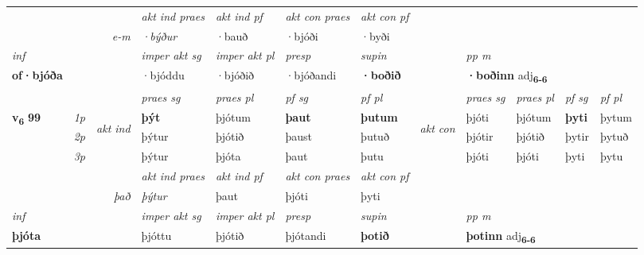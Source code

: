 \begin{longtable}[l]{X>{\footnotesize\itshape}llXXXXlXXXX}
   && &  \textit{akt ind praes} & \textit{akt ind pf} & \textit{akt con praes} & \textit{akt con pf} \\*
\multicolumn{3}{r}{\textit{e-m}} & ·býður & ·bauð & ·bjóði & ·byði \\*

\cmidrule{4-7}
   {\textit{inf}} & &  & \textit{imper akt sg} & \textit{imper akt pl}   & \textit{presp} & \textit{supin}  && \textit{pp m} \\*
  {\textbf{of\allowbreak ·bjóða}} & && ·bjóddu  & ·bjóðið   & ·bjóðandi &  \textbf{·boðið}  && \multicolumn{2}{l}{\textbf{·boðinn} adj\textbf{\textsubscript{6-6}}} \\*

\midrule

 & &   & \textit{praes sg}  & \textit{praes pl}    & \textit{ pf sg} & \textit{pf pl} & & \textit{praes sg}  & \textit{praes pl}    & \textit{pf sg} & \textit{pf pl }  \\ \cmidrule{4-7} \cmidrule{9-12}
 \multirow{2}{*}{{{\textbf{v{\textsubscript{6}}} \Large{\textbf{99}}}}}  & 1p & \multirow{3}{*}{\begin{turn}{90}\textit{akt ind}\end{turn}} & \textbf{þýt} & þjótum & \textbf{þaut} & \textbf{þutum} & \multirow{3}{*}{\begin{turn}{90}\textit{akt con}\end{turn}} &þjóti & þjótum & \textbf{þyti} & þytum\\*
 & 2p &  &  þýtur  & þjótið & þaust & þutuð & & þjótir & þjótið & þytir & þytuð \\*
 & 3p &  & þýtur & þjóta & þaut & þutu & & þjóti & þjóti& þyti & þytu \\*
\cmidrule{4-7} \cmidrule{9-12}

   && &  \textit{akt ind praes} & \textit{akt ind pf} & \textit{akt con praes} & \textit{akt con pf} \\*
\multicolumn{3}{r}{\textit{það}} & þýtur & þaut & þjóti & þyti \\*

\cmidrule{4-7}
   {\textit{inf}} & &  & \textit{imper akt sg} & \textit{imper akt pl}   & \textit{presp} & \textit{supin}  && \textit{pp m} \\*
  {\textbf{þjóta}} & && þjóttu  & þjótið   & þjótandi &  \textbf{þotið}  && \multicolumn{2}{l}{\textbf{þotinn} adj\textbf{\textsubscript{6-6}}} \\*

\midrule


\end{longtable}
